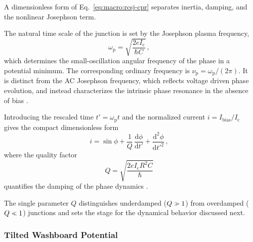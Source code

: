             A dimensionless form of Eq.~\eqref{eq:macro:rcsj-cpr} separates inertia, damping, and the nonlinear Josephson term.

            The natural time scale of the junction is set by the Josephson plasma frequency,
            \begin{equation}
                \omega_\mathrm{p}
                    = \sqrt{\frac{2eI_\mathrm{c}}{\hbar C}}\,,
                \label{eq:macro:rcsj-plasma-frequency}
            \end{equation}
            which determines the small-oscillation angular frequency of the phase in a potential minimum. The corresponding ordinary frequency is $\nu_\mathrm{p}=\omega_\mathrm{p}/(2\pi)$. It is distinct from the AC Josephson frequency, which reflects voltage driven phase evolution, and instead characterizes the intrinsic phase resonance in the absence of bias \cite{mccumber_effect_1968,tinkham_introduction_2004}.

            Introducing the rescaled time $t'=\omega_\mathrm{p} t$ and the normalized current $i = I_\mathrm{bias}/I_\mathrm{c}$ gives the compact dimensionless form
            \begin{equation}
                i 
                = \sin\phi
                + \frac{1}{Q}\,\frac{\mathrm{d}\phi}{\mathrm{d}t'}
                + \frac{\mathrm{d}^2\phi}{\mathrm{d}t'^2}\,,
                \label{eq:macro:rcsj-cpr-norm}
            \end{equation}
            where the quality factor
            \begin{equation}
                Q = \sqrt{\frac{2eI_\mathrm{c}R^2C}{\hbar}}
            \end{equation}
            quantifies the damping of the phase dynamics \cite{mccumber_effect_1968}.

            The single parameter $Q$ distinguishes underdamped ($Q\sgg 1$) from overdamped ($Q\sll 1$) junctions and sets the stage for the dynamical behavior discussed next.

        \subsubsection*{Tilted Washboard Potential}


